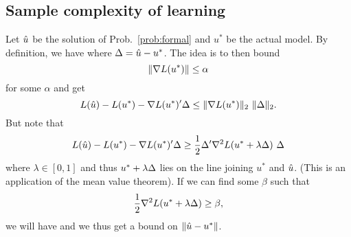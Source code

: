 \documentclass[letterpaper, 11pt, reqno]{amsart}
\begin{document}
\subsection{Sample complexity of learning}
\nocite{negahban2012restricted}
Let $\hat{u}$ be the solution of Prob.~\ref{prob:formal} and $u^*$ be the actual model. By definition, we have
where $\Delta = \hat{u} - u^*$. The idea is to then bound
$$
\lVert\nabla L(u^*)\rVert \leq \alpha
$$
for some $\alpha$ and get
$$
L(\hat{u}) - L(u^*) - \nabla L(u^*)' \Delta \leq \lVert\nabla L(u^*)\rVert_2\ \lVert\Delta\rVert_2.
$$
But note that
$$
L(\hat{u}) - L(u^*) - \nabla L(u^*)' \Delta \geq \frac{1}{2} \Delta' \nabla^2 L(u^* + \lambda \Delta)\ \Delta
$$
where $\lambda \in [0,1]$ and thus $u^* + \lambda \Delta$ lies on the line joining $u^*$ and $\hat{u}$. (This is an application of the mean value theorem).
If we can find some $\beta$ such that
$$
\frac{1}{2} \nabla^2 L(u^* + \lambda \Delta) \geq \beta,
$$
we will have
and we thus get a bound on $\lVert\hat{u} - u^*\rVert$.
\end{document}
